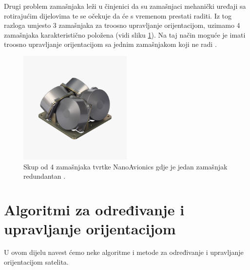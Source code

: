 \documentclass[times, utf8, diplomski, numeric]{templates/template}
\begin{document}
{{{{                Drugi problem zamašnjaka leži u činjenici da su zamašnjaci mehanički uređaji sa rotirajućim dijelovima te se očekuje da će s vremenom prestati raditi. Iz tog razloga umjesto 3 zamašnjaka za troosno upravljanje orijentacijom, uzimamo 4 zamašnjaka karakteristično položena (vidi sliku \ref{fig:cetiri_zamasnjaka}). Na taj način moguće je imati troosno upravljanje orijentacijom sa jednim zamašnjakom koji ne radi \cite{cetiriZamasnjaka}.

                \begin{figure}[htb]
                \centering
                \includegraphics[width=0.5\textwidth]{images/cetiri_zamasnjaka.jpg}
                \caption{Skup od 4 zamašnjaka tvrtke NanoAvionics gdje je jedan zamašnjak redundantan \cite{cetiriZamasnjakaTvrtka}.}
                \label{fig:cetiri_zamasnjaka}
                \end{figure}
            }
        }
    }

    \section{Algoritmi za određivanje i upravljanje orijentacijom}{
        U ovom dijelu navest ćemo neke algoritme i metode za određivanje i upravljanje orijentacijom satelita. 
 
}}
\end{document}
